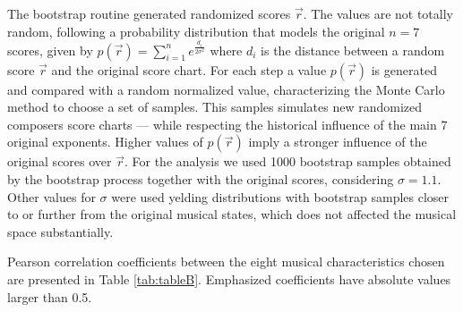 \documentclass[
 aip,
 jmp,
 amsmath,amssymb,
 reprint,
]{revtex4-1}
\begin{document}
The bootstrap routine generated randomized scores $\vec{r}$. The
values are not totally random, following a probability distribution
that models the original $n = 7$ scores, given by 
$p(\vec{r}) = \sum^n_{i=1} e^{\frac{d_i}{2\sigma^2}}$
where $d_i$ is the distance between a random score $\vec{r}$
and the original score chart. For each step a
value $p(\vec{r})$ is generated and compared with a random normalized value,
characterizing the Monte Carlo~\cite{Robert2011} method to choose a set of samples. This
samples simulates new randomized composers score charts --- while respecting the
historical influence of the main 7 original exponents. Higher
values of $p(\vec{r})$ imply a stronger influence of the original scores
over $\vec{r}$. For the analysis
we used 1000 bootstrap samples obtained by the bootstrap process
together with the original scores,
considering $\sigma = 1.1$. Other values for $\sigma$ were used yelding 
distributions with bootstrap samples closer to or further from the original 
musical states, which does not affected the musical space substantially.

Pearson correlation coefficients between the eight musical
characteristics chosen are presented in Table \ref{tab:tableB}.
Emphasized coefficients have absolute values larger than 0.5.
\end{document}
